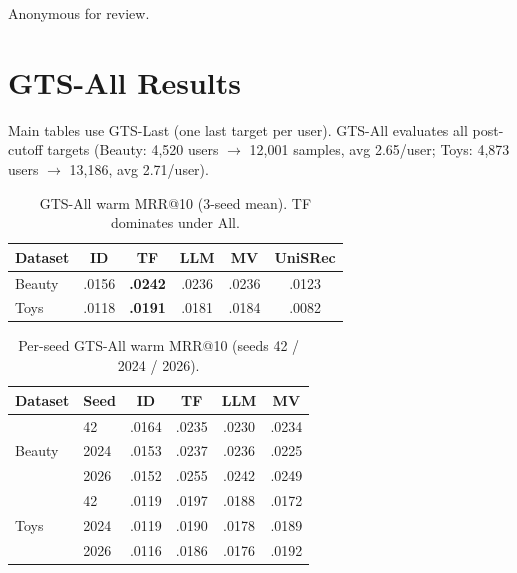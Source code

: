 \documentclass[sigconf,natbib=true,anonymous]{acmart}
\begin{document}
\begin{acks}
Anonymous for review.
\end{acks}




\appendix

\section{GTS-All Results}
\label{app:gts-all}

Main tables use GTS-Last (one last target per user).
GTS-All evaluates all post-cutoff targets (Beauty: 4{,}520 users $\to$ 12{,}001 samples, avg 2.65/user; Toys: 4{,}873 users $\to$ 13{,}186, avg 2.71/user).

\begin{table}[h]
\centering
\caption{GTS-All warm MRR@10 (3-seed mean).  TF dominates under All.}
\label{tab:gts-all}
\small
\begin{tabular}{@{}lccccc@{}}
\toprule
Dataset & ID & TF & LLM & MV & UniSRec \\
\midrule
Beauty & .0156 & \textbf{.0242} & .0236 & .0236 & .0123 \\
Toys   & .0118 & \textbf{.0191} & .0181 & .0184 & .0082 \\
\bottomrule
\end{tabular}
\end{table}

\begin{table}[h]
\centering
\caption{Per-seed GTS-All warm MRR@10 (seeds 42 / 2024 / 2026).}
\label{tab:gts-all-perseed}
\small
\setlength{\tabcolsep}{3.5pt}
\begin{tabular}{@{}llcccc@{}}
\toprule
Dataset & Seed & ID & TF & LLM & MV \\
\midrule
\multirow{3}{*}{Beauty}
 & 42    & .0164 & .0235 & .0230 & .0234 \\
 & 2024  & .0153 & .0237 & .0236 & .0225 \\
 & 2026  & .0152 & .0255 & .0242 & .0249 \\
\midrule
\multirow{3}{*}{Toys}
 & 42    & .0119 & .0197 & .0188 & .0172 \\
 & 2024  & .0119 & .0190 & .0178 & .0189 \\
 & 2026  & .0116 & .0186 & .0176 & .0192 \\
\bottomrule
\end{tabular}
\end{table}
\end{document}
